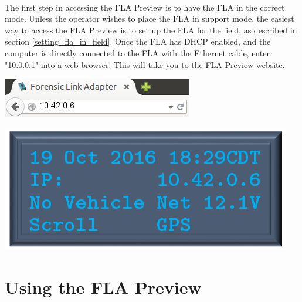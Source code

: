 \documentclass[11pt, oneside]{book}
\begin{document}
\paragraph{  }
The first step in accessing the FLA Preview is to have the FLA in the correct mode. Unless the operator wishes to place the FLA in support mode, the easiest way to access the FLA Preview is to set up the FLA for the field, as described in section \ref{setting_fla_in_field}. Once the FLA has DHCP enabled, and the computer is directly connected to the FLA with the Ethernet cable, enter "10.0.0.1" into a web browser. This will take you to the FLA Preview website.
\\[\baselineskip]
\noindent\begin{minipage}{0.45\textwidth}%
	\includegraphics[width=\linewidth]{../media/fla_preview_screenshots/url_correct_dhcp} 
\end{minipage}%
\hfill%
\begin{minipage}{0.45\textwidth} 
	\includegraphics[width=\linewidth]{../media/pstricks_files/01_main_screen_10_42_ip}
\end{minipage}
\section{Using the FLA Preview}
\end{document}

